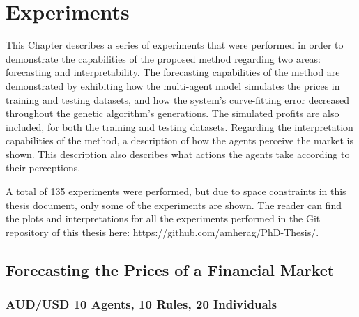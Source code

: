 \chapter{Experiments}
\label{chapter:experiments}

This Chapter describes a series of experiments that were performed in order to
demonstrate the capabilities of the proposed method regarding two areas:
forecasting and interpretability. The forecasting capabilities of the method are
demonstrated by exhibiting how the multi-agent model simulates the prices in
training and testing datasets, and how the system's curve-fitting error
decreased throughout the genetic algorithm's generations. The simulated profits
are also included, for both the training and testing datasets. Regarding the
interpretation capabilities of the method, a description of how the agents
perceive the market is shown. This description also describes what actions the
agents take according to their perceptions.

A total of 135 experiments were performed, but due to space constraints in this
thesis document, only some of the experiments are shown. The reader can find the
plots and interpretations for all the experiments performed in the Git
repository of this thesis here: https://github.com/amherag/PhD-Thesis/.


\section{Forecasting the Prices of a Financial Market}
\label{section:forecasting-the-prices-of-a-financial-market}

\subsection{AUD/USD 10 Agents, 10 Rules, 20 Individuals}
\label{}

